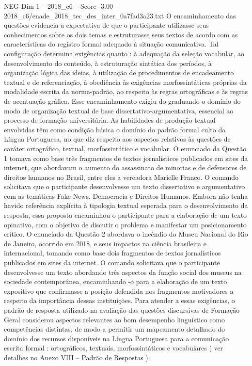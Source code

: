 \begin{textsample}{NEG Dim 1 – 2018\_c6 – Score -3.00 – 2018\_c6/enade\_2018\_tec\_des\_inter\_0a7fad3a23.txt}
O encaminhamento das questões evidencia a expectativa de que o participante utilizasse seus conhecimentos sobre os dois temas e estruturasse seus textos de acordo com as características do registro formal adequado à situação comunicativa.
Tal configuração determina exigências quanto : à adequação da seleção vocabular, ao desenvolvimento do conteúdo, à estruturação sintática dos períodos, à organização lógica das ideias, à utilização de procedimentos de encadeamento textual e de referenciação, à obediência às exigências morfossintáticas próprias da modalidade escrita da norma-padrão, ao respeito às regras ortográficas e às regras de acentuação gráfica.
Esse encaminhamento exigiu do graduando o domínio do modo de organização textual de base dissertativo-argumentativa, essencial ao processo de formação universitária.
As habilidades de produção textual envolvidas têm como condição básica o domínio do padrão formal culto da Língua Portuguesa, no que diz respeito aos aspectos relativos às questões de caráter ortográfico, textual, morfossintático e vocabular.
O enunciado da Questão 1 tomava como base três fragmentos de textos jornalísticos publicados em sites da internet, que abordavam o aumento do assassinato de minorias e de defensores de direitos humanos no Brasil, entre eles a vereadora Marielle Franco.
O comando solicitava que o participante desenvolvesse um texto dissertativo e argumentativo com as temáticas Fake News, Democracia e Direitos Humanos.
Embora não tenha havido referência explícita à tipologia textual esperada para o desenvolvimento da resposta, essa proposta encaminhou o participante para a elaboração de um texto opinativo, com o objetivo de discutir o problema e manifestar um posicionamento crítico.
O enunciado da Questão 2 abordava o incêndio do Museu Nacional do Rio de Janeiro, ocorrido em 2018, e seus impactos na ciência brasileira e internacional, tomando como base dois fragmentos de textos jornalísticos publicados em sites da internet.
O comando solicitava que o participante desenvolvesse um texto abordando três aspectos da função social dos museus na sociedade contemporânea, encaminhando -o para a elaboração de um texto expositivo que confirmasse a posição defendida nos fragmentos motivadores a respeito da importância dessas instituições.
Para atender a essas exigências, o padrão de resposta utilizado na avaliação das questões discursivas de Formação Geral considerou aspectos relevantes ao bom desempenho linguístico como competências distintas, de modo a permitir um mapeamento detalhado do domínio dos recursos disponíveis na Língua Portuguesa para a comunicação escrita formal : ortográficos, textuais, morfossintáticos e vocabulares ( ver detalhes no Anexo VIII – Padrão de Respostas ).

\end{textsample}
